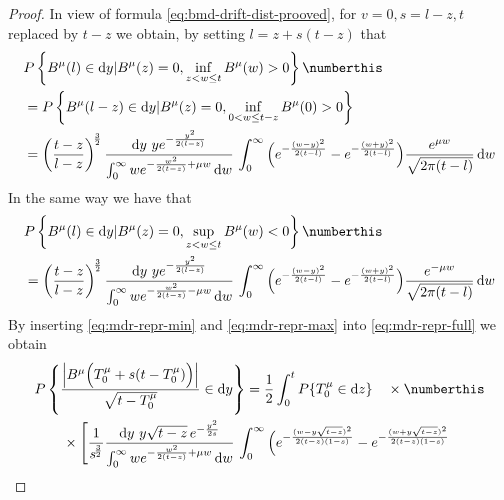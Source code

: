 \begin{proof}
	In view of formula \eqref{eq:bmd-drift-dist-prooved}, for $  v = 0, s = l - z, t $ replaced by $  t -z  $
	we obtain, by setting $  l = z + s ( t-z) $ that
	\begin{align*}
	&
	P\left\{ 
	B^\mu ( l) \in \mathrm d y | B^\mu(z)  = 0 ,  
	\inf_{z < w \leq t} B^\mu ( w ) > 0 
	\right\}
	\numberthis 
	\label{eq:mdr-repr-min}
	\\
	&=
	P\left\{ 
	B^\mu ( l - z ) \in \mathrm d y | B^\mu(z)  = 0 ,  
	\inf_{0 < w \leq t - z } B^\mu ( 0 ) > 0 
	\right\}
	\\
	&=
	\left ( \frac{t - z  }{l - z }\right ) ^{\!\frac 32}
	\frac{
		\mathrm d y \,\, 
		y e^{ - \frac{ y^2}{2 (l-z) }} 		
	}{
		\int_0^\infty 
		w 
		e^{- \frac{ w^2}{2 (t-z)}  + \mu w}    
		\, \mathrm d w 		
	}\,
	\int_0^\infty 
	\Big( 
	e^{- \frac{ ( w - y)^2}{2(t-l)}} 
	- e^{   - \frac{ (w+y)^2}{2 ( t-l)}   }
	\Big ) 
	\frac{  e^{ \mu w } } {\sqrt{2 \pi (t - l)}}
	 \, \mathrm d w
	\end{align*}
	In the same way we have that
	\begin{align*}
	&
	P\left\{ 
	B^\mu ( l) \in \mathrm d y | B^\mu(z)  = 0 ,  
	\sup_{z < w \leq t} B^\mu ( w ) < 0 
	\right\}
	\numberthis 
	\label{eq:mdr-repr-max}
	\\
	&=
	\left ( \frac{t - z  }{l - z }\right ) ^{\!\frac 32}
	\frac{
		\mathrm d y \,\, 
		y e^{ - \frac{ y^2}{2 (l-z) }} 		
	}{
		\int_0^\infty 
		w 
		e^{- \frac{ w^2}{2 (t-z)}  - \mu w}    
		\, \mathrm d w 		
	}\,
	\int_0^\infty 
	\Big( 
	e^{- \frac{ ( w - y)^2}{2(t-l)}} 
	- e^{   - \frac{ (w+y)^2}{2 ( t-l)}   }
	\Big ) 
	\frac{  e^{ - \mu w } } {\sqrt{2 \pi (t - l)}}
	\, \mathrm d w
	\end{align*}
	By inserting  \eqref{eq:mdr-repr-min} and  \eqref{eq:mdr-repr-max} 
	into \eqref{eq:mdr-repr-full}  we obtain 
	\begin{align*}
	&
	P\left\{   
	\frac { 
		\Big | B^\mu\Big ( T_0^\mu + s ( t - T_0^\mu) \Big )  \Big |    
	}
	{
		\sqrt{t - T^\mu_0}
	} \in \mathrm d y 
	\right\} 
	=
	\frac{1}{2}
	\int_0^t P \{ T_0^\mu \in \mathrm d z \}  \quad \times
	\numberthis 
	\label{eq:mdr-repr-full-ins}
	\\
	& \qquad \times 
	\Bigg[ 
	 \frac{1}{s^{\!\frac 32} } 
	\frac{
		\mathrm d y \,\, 
		y \sqrt{t-z} \, e^{ - \frac{ y^2}{2 s }} 		
	}{
		\int_0^\infty 
		w 
		e^{- \frac{ w^2}{2 (t-z)}  + \mu w}    
		\, \mathrm d w 		
	}\,
	\int_0^\infty 
	\Big( 
	e^{- \frac{ ( w - y \sqrt{t-z}   )^2  }{    2(t-z)(1-s)}} 
	- e^{   - \frac{ (w+y \sqrt{t-z} )^2}{2 ( t-z)(1-s)}   }

\end{align*}
\end{proof}
